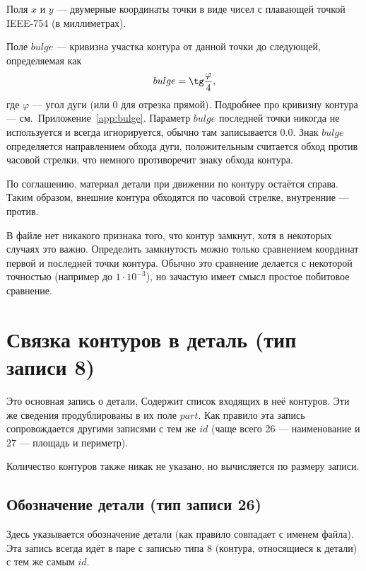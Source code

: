 Поля
$x$ и $y$ ---
двумерные координаты точки в виде
чисел с плавающей точкой  IEEE-754
(в миллиметрах).

Поле
$bulge$ ---
кривизна участка контура от данной точки до следующей,
определяемая как
$$
bulge =
\tg \frac{\varphi}{4}
,
$$
где
$\varphi$ --- угол дуги
(или 0 для отрезка прямой).
Подробнее про кривизну контура ---
см.~Приложение~\ref{app:bulge}.
Параметр $bulge$
последней точки никогда не используется и всегда игнорируется,
обычно там записывается $0.0$.
Знак
$bulge$
определяется направлением обхода дуги,
положительным считается обход против часовой стрелки,
что немного противоречит знаку обхода контура.

По соглашению,
материал детали при движении по контуру остаётся справа.
Таким образом, внешние контура обходятся по часовой стрелке,
внутренние --- против.

В файле нет никакого признака того,
что контур замкнут,
хотя в некоторых случаях это важно.
Определить замкнутость можно только сравнением координат первой и последней точки контура.
Обычно это сравнение делается с некоторой точностью
(например до $1\cdot 10^{-3}$),
но зачастую имеет смысл простое побитовое сравнение.

\section*{Связка контуров в деталь (тип записи 8)}
Это основная запись о детали,
Содержит список входящих в неё контуров.
Эти же сведения продублированы в их поле $part$.
Как правило эта запись сопровождается другими записями
с тем же $id$
(чаще всего 26 --- наименование и
27 --- площадь и периметр).


Количество контуров также никак не указано,
но вычисляется по размеру записи.

\subsection*{Обозначение детали (тип записи 26)}
Здесь указывается обозначение детали (как правило совпадает с именем файла).
Эта запись всегда идёт в паре с записью типа 8
(контура, относящиеся к детали)
с тем же самым $id$.

